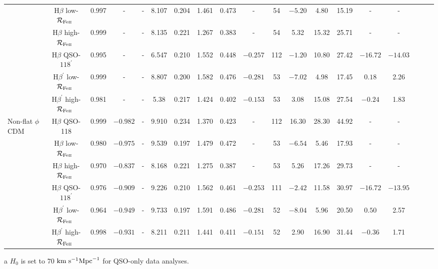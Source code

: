 \documentclass[a4paper,fleqn,usenatbib]{mnras}
\newcommand{\rfe}{${\cal R}_{\rm{Fe\textsc{ii}}}$}
\begin{document}
\begin{table*}
\begin{threeparttable}
\begin{tabular}{l|cccccccccccccccccc}
		& H$\beta$ low-\rfe\ & 0.997 & - & - & 8.107 & 0.204 & 1.461 & 0.473 & - & 54 & $-5.20$ & 4.80 & 15.19 & - & - \\
		& H$\beta$ high-\rfe\ & 0.999 & - & - & 8.135 & 0.221 & 1.267 & 0.383 & - & 54 & 5.32 & 15.32 & 25.71 & - & - \\
		& H$\beta$ QSO-$118^{\prime}$ & 0.995 & - & - & 6.547& 0.210 & 1.552 & 0.448 & $-0.257$ & 112 & $-1.20$ & 10.80 & 27.42 & $-16.72$ & $-14.03$ \\
		& H$\beta^{\prime}$ low-\rfe\ & 0.999 & - & - & 8.807& 0.200 & 1.582 & 0.476 & $-0.281$ & 53 & $-7.02$ & 4.98 & 17.45 & $0.18$ & 2.26 \\
		& H$\beta^{\prime}$ high-\rfe\ & 0.981 & - & - & 5.38& 0.217 & 1.424 & 0.402 & $-0.153$ & 53 & 3.08 & 15.08 & 27.54 & $-0.24$ & 1.83\\
		\hline
		Non-flat $\phi$CDM & H$\beta$ QSO-118 & 0.999 & $-0.982$ & - & 9.910& 0.234 & 1.370 & 0.423 & - & 112 & 16.30 & 28.30 & 44.92 & - & - \\
		& H$\beta$ low-\rfe\ & 0.980 & $-0.975$ & - & 9.539 & 0.197 & 1.479 & 0.472 & - & 53 & $-6.54$ & 5.46 & 17.93 & - & - \\
		& H$\beta$ high-\rfe\ & 0.970 & $-0.837$ & - & 8.168 & 0.221 & 1.275 & 0.387 & - & 53 & 5.26 & 17.26 & 29.73 & - & - \\
		& H$\beta$ QSO-$118^{\prime}$ & 0.976 & $-0.909$ & - & 9.226 & 0.210 & 1.562 & 0.461 & $-0.253$ & 111 & $-2.42$ & 11.58 & 30.97 & $-16.72$ & $-13.95$\\
		& H$\beta^{\prime}$ low-\rfe\ & 0.964 & $-0.949$ & - & 9.733 & 0.197 & 1.591 & 0.486 & $-0.281$ & 52 & $-8.04$ & 5.96 & 20.50 & $0.50$ & 2.57\\
		& H$\beta^{\prime}$ high-\rfe\ & 0.998 & $-0.931$ & - & 8.211 & 0.211 & 1.441 & 0.411 & $-0.151$ & 52 & 2.90 & 16.90 & 31.44 & $-0.36$ & 1.71\\
		\hline
	\end{tabular}
	\begin{tablenotes}
    \item[a] $H_0$ is set to $70$ ${\rm km}\hspace{1mm}{\rm s}^{-1}{\rm Mpc}^{-1}$ for QSO-only data analyses.
    \end{tablenotes}
    \end{threeparttable}
\end{table*}
\end{document}
